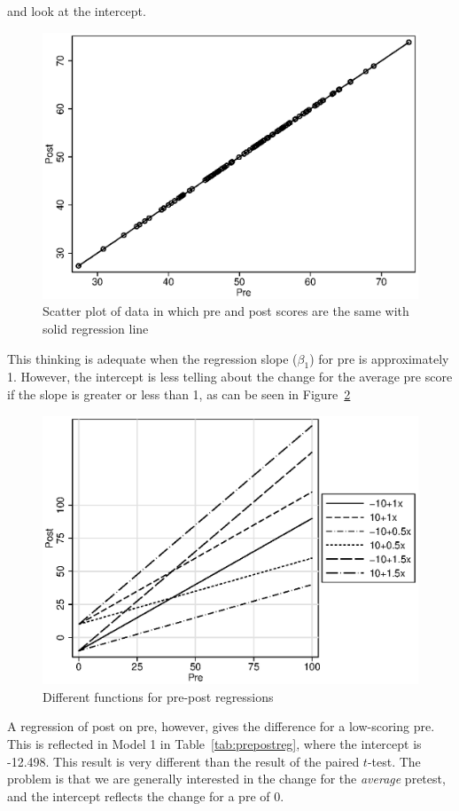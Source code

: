 and look at the intercept.

\begin{figure}
   \centering
   \includegraphics[angle=0,
           width=.75\textwidth]{prepostsame.eps}
   \caption{Scatter plot of data in which pre and post scores are the same with solid regression line}
  \label{fig:prepostsame}
\end{figure}

This thinking is adequate when the regression slope ($\beta_1$) for pre is approximately 1. However, the intercept is less telling about the change for the average pre score if the slope is greater or less than 1, as can be seen in Figure~\ref{fig:prepostalt}

\begin{figure}
   \centering
   \includegraphics[angle=0,
           width=.75\textwidth]{prepostalt.eps}
   \caption{Different functions for pre-post regressions}
  \label{fig:prepostalt}
\end{figure}

A regression of post on pre, however, gives the difference for a low-scoring pre. This is reflected in Model 1 in Table~\ref{tab:prepostreg}, where the intercept is -12.498. This result is very different than the result of the paired $t$-test. The problem is that we are generally interested in the change for the {\it average} pretest, and the intercept reflects the change for a pre of 0.

